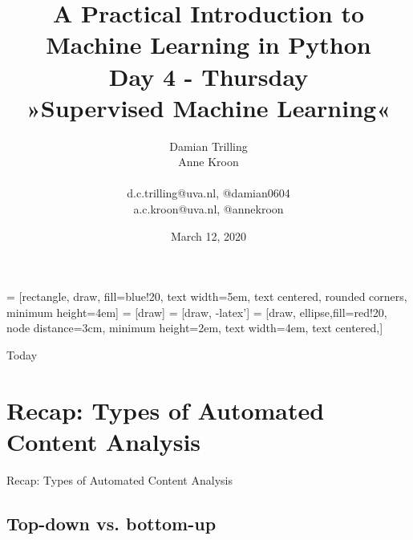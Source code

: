 \documentclass{beamer}
\begin{document}
\title[Big Data and Automated Content Analysis]{\textbf{A Practical Introduction to Machine Learning in Python} \\Day 4 - Thursday \\ »Supervised Machine Learning«}
\author[Damian Trilling, Anne Kroon]{Damian Trilling \\ Anne Kroon \\ ~ \\ \footnotesize{d.c.trilling@uva.nl, @damian0604 \\a.c.kroon@uva.nl, @annekroon} \\}
\date{March 12, 2020}


 = [rectangle, draw, fill=blue!20, 
text width=5em, text centered, rounded corners, minimum height=4em]
 = [draw]
 = [draw, -latex']
 = [draw, ellipse,fill=red!20, node distance=3cm,
minimum height=2em, text width=4em, text centered,]




\begin{frame}{}
\titlepage
\end{frame}

\begin{frame}{Today}
\tableofcontents
\end{frame}



\section[Recap]{Recap: Types of Automated Content Analysis}
\begin{frame}{}
Recap: Types of Automated Content Analysis
\end{frame}
\subsection*{Top-down vs. bottom-up}


\begin{frame}[plain]
\end{frame}
\end{document}
